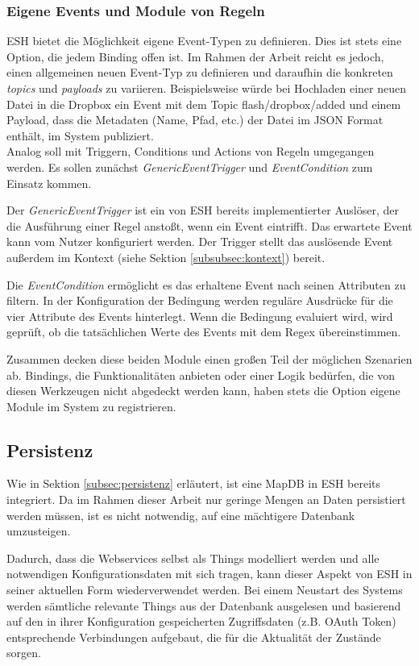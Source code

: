 \subsubsection{Eigene Events und Module von Regeln}
ESH bietet die Möglichkeit eigene Event-Typen zu definieren. Dies ist stets eine Option, die jedem Binding offen ist. Im Rahmen der Arbeit reicht es jedoch, einen allgemeinen neuen Event-Typ zu definieren und daraufhin die konkreten \textit{topics} und \textit{payloads} zu variieren. Beispielsweise würde bei Hochladen einer neuen Datei in die Dropbox ein Event mit dem Topic \glqq flash/dropbox/added\grqq{} und einem Payload, dass die Metadaten (Name, Pfad, etc.) der Datei im JSON Format enthält, im System publiziert.\\

Analog soll mit Triggern, Conditions und Actions von Regeln umgegangen werden. Es sollen zunächst \textit{GenericEventTrigger} und \textit{EventCondition} zum Einsatz kommen. 

Der \textit{GenericEventTrigger} ist ein von ESH bereits implementierter Auslöser, der die Ausführung einer Regel anstoßt, wenn ein Event eintrifft. Das erwartete Event kann vom Nutzer konfiguriert werden. Der Trigger stellt das auslösende Event außerdem im Kontext (siehe Sektion \ref{subsubsec:kontext}) bereit.

Die \textit{EventCondition} ermöglicht es das erhaltene Event nach seinen Attributen zu filtern. In der Konfiguration der Bedingung werden reguläre Ausdrücke für die vier Attribute des Events hinterlegt. Wenn die Bedingung evaluiert wird, wird geprüft, ob die tatsächlichen Werte des Events mit dem Regex übereinstimmen. 

Zusammen decken diese beiden Module einen großen Teil der möglichen Szenarien ab. Bindings, die Funktionalitäten anbieten oder einer Logik bedürfen, die von diesen Werkzeugen nicht abgedeckt werden kann, haben stets die Option eigene Module im System zu registrieren.




\subsection{Persistenz}
Wie in Sektion \ref{subsec:persistenz} erläutert, ist eine MapDB in ESH bereits integriert. Da im Rahmen dieser Arbeit nur geringe Mengen an Daten persistiert werden müssen, ist es nicht notwendig, auf eine mächtigere Datenbank umzusteigen. 

Dadurch, dass die Webservices selbst als Things modelliert werden und alle notwendigen Konfigurationsdaten mit sich tragen, kann dieser Aspekt von ESH in seiner aktuellen Form wiederverwendet werden. Bei einem Neustart des Systems werden sämtliche relevante Things aus der Datenbank ausgelesen und basierend auf den in ihrer Konfiguration gespeicherten Zugriffsdaten (z.B. OAuth Token) entsprechende Verbindungen aufgebaut, die für die Aktualität der Zustände sorgen.


